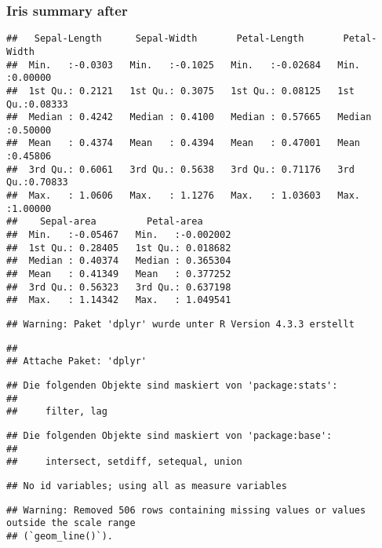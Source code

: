 \documentclass[
]{article}
\begin{document}
\subsubsection{Iris summary after}\label{iris-summary-after}

\begin{verbatim}
##   Sepal-Length      Sepal-Width       Petal-Length       Petal-Width     
##  Min.   :-0.0303   Min.   :-0.1025   Min.   :-0.02684   Min.   :0.00000  
##  1st Qu.: 0.2121   1st Qu.: 0.3075   1st Qu.: 0.08125   1st Qu.:0.08333  
##  Median : 0.4242   Median : 0.4100   Median : 0.57665   Median :0.50000  
##  Mean   : 0.4374   Mean   : 0.4394   Mean   : 0.47001   Mean   :0.45806  
##  3rd Qu.: 0.6061   3rd Qu.: 0.5638   3rd Qu.: 0.71176   3rd Qu.:0.70833  
##  Max.   : 1.0606   Max.   : 1.1276   Max.   : 1.03603   Max.   :1.00000  
##    Sepal-area         Petal-area       
##  Min.   :-0.05467   Min.   :-0.002002  
##  1st Qu.: 0.28405   1st Qu.: 0.018682  
##  Median : 0.40374   Median : 0.365304  
##  Mean   : 0.41349   Mean   : 0.377252  
##  3rd Qu.: 0.56323   3rd Qu.: 0.637198  
##  Max.   : 1.14342   Max.   : 1.049541
\end{verbatim}

\begin{verbatim}
## Warning: Paket 'dplyr' wurde unter R Version 4.3.3 erstellt
\end{verbatim}

\begin{verbatim}
## 
## Attache Paket: 'dplyr'
\end{verbatim}

\begin{verbatim}
## Die folgenden Objekte sind maskiert von 'package:stats':
## 
##     filter, lag
\end{verbatim}

\begin{verbatim}
## Die folgenden Objekte sind maskiert von 'package:base':
## 
##     intersect, setdiff, setequal, union
\end{verbatim}

\begin{verbatim}
## No id variables; using all as measure variables
\end{verbatim}

\begin{verbatim}
## Warning: Removed 506 rows containing missing values or values outside the scale range
## (`geom_line()`).
\end{verbatim}
\end{document}
